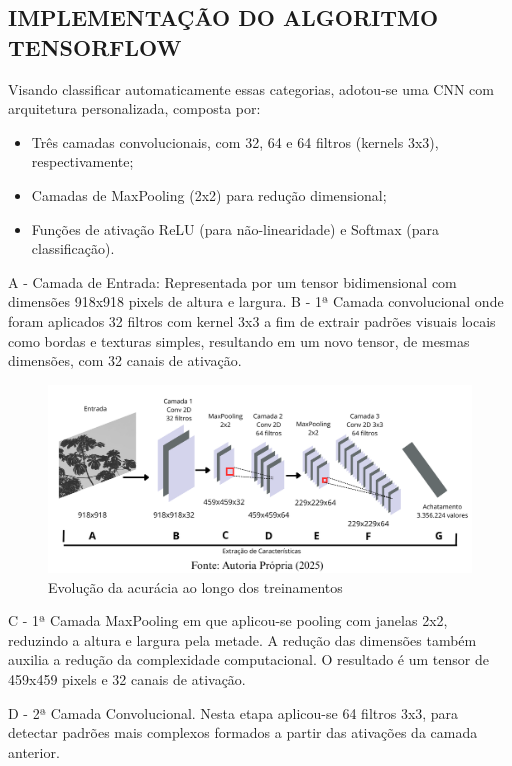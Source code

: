 \subsection*{IMPLEMENTAÇÃO DO ALGORITMO TENSORFLOW}

Visando classificar automaticamente essas categorias, adotou-se uma CNN com arquitetura personalizada, composta por:

\begin{itemize}

    \item Três camadas convolucionais, com 32, 64 e 64 filtros (kernels 3x3), respectivamente;
    \item Camadas de MaxPooling (2x2) para redução dimensional;
    \item Funções de ativação ReLU (para não-linearidade) e Softmax (para classificação).
   
\end{itemize}

A - Camada de Entrada: Representada por um tensor bidimensional com dimensões 918x918 pixels de altura e largura.
B - 1ª Camada convolucional onde foram aplicados 32 filtros com kernel 3x3 a fim de extrair padrões visuais locais como bordas e texturas simples, resultando em um novo tensor, de mesmas dimensões, com 32 canais de ativação.


\begin{figure}[!h]
    \centering
    \caption{Evolução da acurácia ao longo dos treinamentos}
    \label{Gráfico 3}
    \includegraphics[width=0.9\linewidth]{Illustrations/tensorflow1.png}
\end{figure}

C - 1ª Camada MaxPooling em que aplicou-se pooling  com janelas 2x2, reduzindo a altura e largura pela metade. A redução das dimensões também auxilia a redução da complexidade computacional. O resultado é um tensor de 459x459 pixels e 32 canais de ativação.

D - 2ª Camada Convolucional. Nesta etapa aplicou-se 64 filtros 3x3, para detectar padrões mais complexos formados a partir das ativações da camada anterior.

